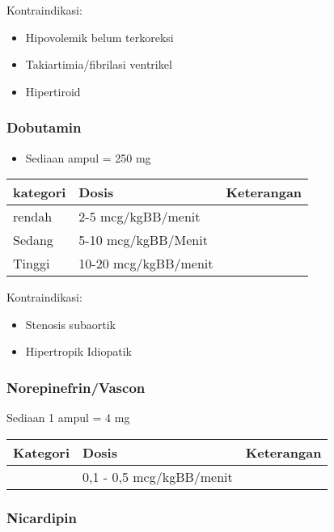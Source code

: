 \documentclass[
]{book}
\providecommand{\tightlist}{%
  \setlength{\itemsep}{0pt}\setlength{\parskip}{0pt}}
\begin{document}
Kontraindikasi:

\begin{itemize}
\tightlist
\item
  Hipovolemik belum terkoreksi
\item
  Takiartimia/fibrilasi ventrikel
\item
  Hipertiroid
\end{itemize}

\hypertarget{dobutamin}{%
\subsubsection{Dobutamin}\label{dobutamin}}

\begin{itemize}
\tightlist
\item
  Sediaan ampul = 250 mg
\end{itemize}

\begin{longtable}[]{@{}lll@{}}
\toprule
kategori & Dosis & Keterangan\tabularnewline
\midrule
\endhead
rendah & 2-5 mcg/kgBB/menit &\tabularnewline
Sedang & 5-10 mcg/kgBB/Menit &\tabularnewline
Tinggi & 10-20 mcg/kgBB/menit &\tabularnewline
\bottomrule
\end{longtable}

Kontraindikasi:

\begin{itemize}
\tightlist
\item
  Stenosis subaortik
\item
  Hipertropik Idiopatik
\end{itemize}

\hypertarget{norepinefrinvascon}{%
\subsubsection{Norepinefrin/Vascon}\label{norepinefrinvascon}}

Sediaan 1 ampul = 4 mg

\begin{longtable}[]{@{}lll@{}}
\toprule
Kategori & Dosis & Keterangan\tabularnewline
\midrule
\endhead
& 0,1 - 0,5 mcg/kgBB/menit &\tabularnewline
\bottomrule
\end{longtable}

\hypertarget{nicardipin}{%
\subsubsection{Nicardipin}\label{nicardipin}}
\end{document}
